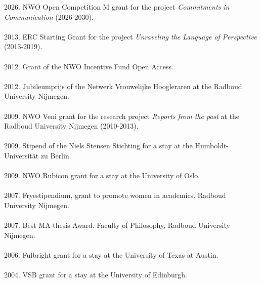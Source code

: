\documentclass[a4paper,11pt]{article}
\begin{document}
2026. NWO Open Competition M grant for the project \emph{Commitments in Communication} (2026-2030).\\\\
2013. ERC Starting Grant for the project \emph{Unraveling the Language of Perspective} (2013-2019).\\\\
2012. Grant of the NWO Incentive Fund Open Access.\\\\
2012. Jubileumprijs of the Netwerk Vrouwelijke Hoogleraren at the Radboud University Nijmegen.\\\\
2009.  NWO Veni grant for the research project \emph{Reports from the past} at the Radboud University Nijmegen (2010-2013).\\\\
2009.  Stipend of the Niels Stensen Stichting for a stay at the Humboldt-Universit\"at zu Berlin.\\\\
2009. NWO Rubicon grant for a stay at the University of Oslo.\\\\
2007. Fryestipendium, grant to promote women in academics. Radboud University Nijmegen.\\\\ 
2007. Best MA thesis Award. Faculty of Philosophy, Radboud University Nijmegen.\\\\  
2006. Fulbright grant for a stay at the University of Texas at Austin.\\\\ 
2004. VSB grant for a stay at the University of
Edinburgh.\\
\end{document}
